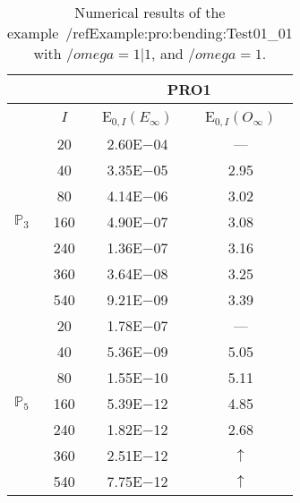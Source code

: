 \begin{table}[H]
\caption{Numerical results of the example~/ref{Example:pro:bending:Test01_01} with $/omega=1|1$, and $/omega=1$.}
\setlength{\tabcolsep}{5pt}
\centering
\begin{tabular}{@{}l c c c@{}}
\toprule
 &  & \multicolumn{2}{c}{PRO1}\\
\midrule
 & $I$ & E$_{0,I}(E_{\infty})$ & E$_{0,I}(O_{\infty})$\\
\midrule
\multirow{7}{*}{$\mathbb{P}_{3}$}
 & 20 & 2.60E$-$04 & ---\\
 & 40 & 3.35E$-$05 & 2.95\\
 & 80 & 4.14E$-$06 & 3.02\\
 & 160 & 4.90E$-$07 & 3.08\\
 & 240 & 1.36E$-$07 & 3.16\\
 & 360 & 3.64E$-$08 & 3.25\\
 & 540 & 9.21E$-$09 & 3.39\\
\midrule
\multirow{7}{*}{$\mathbb{P}_{5}$}
 & 20 & 1.78E$-$07 & ---\\
 & 40 & 5.36E$-$09 & 5.05\\
 & 80 & 1.55E$-$10 & 5.11\\
 & 160 & 5.39E$-$12 & 4.85\\
 & 240 & 1.82E$-$12 & 2.68\\
 & 360 & 2.51E$-$12 & $\uparrow$\\
 & 540 & 7.75E$-$12 & $\uparrow$\\
\bottomrule
\end{tabular}
\label{Table:pRO:test_01_01_test5_pro2}
\end{table}
